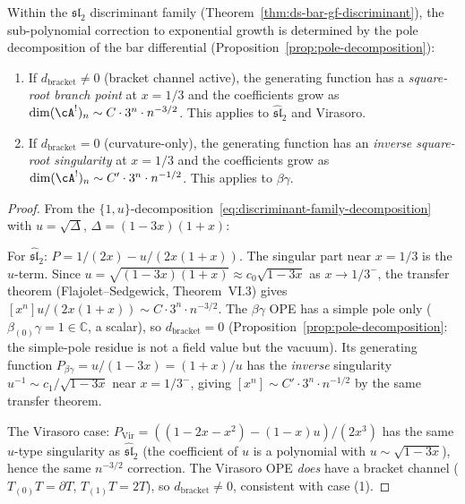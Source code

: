 \begin{proposition}
\label{prop:pole-singularity-type}
Within the $\mathfrak{sl}_2$ discriminant family
(Theorem~\textup{\ref{thm:ds-bar-gf-discriminant}}), the sub-polynomial
correction to exponential growth is determined by the pole decomposition
of the bar differential
(Proposition~\textup{\ref{prop:pole-decomposition}}):
\begin{enumerate}
\item If $d_{\mathrm{bracket}} \neq 0$ (bracket channel active),
  the generating function has a \emph{square-root branch point}
  at $x = 1/3$ and the coefficients grow as
  $\dim (\cA^!)_n \sim C \cdot 3^n \cdot n^{-3/2}$.
  This applies to $\widehat{\mathfrak{sl}}_2$ and Virasoro.
\item If $d_{\mathrm{bracket}} = 0$ (curvature-only), the generating function
  has an \emph{inverse square-root singularity} at $x = 1/3$ and
  the coefficients grow as
  $\dim (\cA^!)_n \sim C' \cdot 3^n \cdot n^{-1/2}$.
  This applies to $\beta\gamma$.
\end{enumerate}
\end{proposition}

\begin{proof}
From the $\{1, u\}$-decomposition~\eqref{eq:discriminant-family-decomposition}
with $u = \sqrt{\Delta}$, $\Delta = (1{-}3x)(1{+}x)$:

For $\widehat{\mathfrak{sl}}_2$: $P = 1/(2x) - u/(2x(1{+}x))$.
The singular part near $x = 1/3$ is the $u$-term.  Since
$u = \sqrt{(1{-}3x)(1{+}x)} \approx c_0\sqrt{1{-}3x}$ as $x \to 1/3^-$,
the transfer theorem (Flajolet--Sedgewick, Theorem~VI.3) gives
$[x^n] u/(2x(1{+}x)) \sim C \cdot 3^n \cdot n^{-3/2}$.
The $\beta\gamma$ OPE has a simple pole only
($\beta_{(0)}\gamma = 1 \in \mathbb{C}$, a scalar),
so $d_{\mathrm{bracket}} = 0$
(Proposition~\ref{prop:pole-decomposition}: the simple-pole residue is
not a field value but the vacuum).
Its generating function $P_{\beta\gamma} = u/(1{-}3x) = (1{+}x)/u$
has the \emph{inverse} singularity $u^{-1} \sim c_1 / \sqrt{1{-}3x}$
near $x = 1/3^-$, giving $[x^n] \sim C' \cdot 3^n \cdot n^{-1/2}$
by the same transfer theorem.

The Virasoro case: $P_{\mathrm{Vir}} = ((1{-}2x{-}x^2) - (1{-}x)u)/(2x^3)$
has the same $u$-type singularity as $\widehat{\mathfrak{sl}}_2$
(the coefficient of $u$ is a polynomial with $u \sim \sqrt{1{-}3x}$),
hence the same $n^{-3/2}$ correction.
The Virasoro OPE \emph{does} have a bracket channel
($T_{(0)}T = \partial T$, $T_{(1)}T = 2T$),
so $d_{\mathrm{bracket}} \neq 0$, consistent with case (1).
\end{proof}

